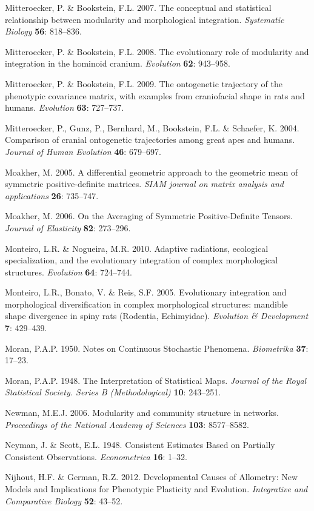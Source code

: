 \documentclass[12pt,twoside]{report}
\begin{document}
Mitteroecker, P. \& Bookstein, F.L. 2007. The conceptual and statistical
relationship between modularity and morphological integration.
\emph{Systematic Biology} \textbf{56}: 818--836.

Mitteroecker, P. \& Bookstein, F.L. 2008. The evolutionary role of
modularity and integration in the hominoid cranium. \emph{Evolution}
\textbf{62}: 943--958.

Mitteroecker, P. \& Bookstein, F.L. 2009. The ontogenetic trajectory of
the phenotypic covariance matrix, with examples from craniofacial shape
in rats and humans. \emph{Evolution} \textbf{63}: 727--737.

Mitteroecker, P., Gunz, P., Bernhard, M., Bookstein, F.L. \& Schaefer,
K. 2004. Comparison of cranial ontogenetic trajectories among great apes
and humans. \emph{Journal of Human Evolution} \textbf{46}: 679--697.

Moakher, M. 2005. A differential geometric approach to the geometric
mean of symmetric positive-definite matrices. \emph{SIAM journal on
matrix analysis and applications} \textbf{26}: 735--747.

Moakher, M. 2006. On the Averaging of Symmetric Positive-Definite
Tensors. \emph{Journal of Elasticity} \textbf{82}: 273--296.

Monteiro, L.R. \& Nogueira, M.R. 2010. Adaptive radiations, ecological
specialization, and the evolutionary integration of complex
morphological structures. \emph{Evolution} \textbf{64}: 724--744.

Monteiro, L.R., Bonato, V. \& Reis, S.F. 2005. Evolutionary integration
and morphological diversification in complex morphological structures:
mandible shape divergence in spiny rats (Rodentia, Echimyidae).
\emph{Evolution \& Development} \textbf{7}: 429--439.

Moran, P.A.P. 1950. Notes on Continuous Stochastic Phenomena.
\emph{Biometrika} \textbf{37}: 17--23.

Moran, P.A.P. 1948. The Interpretation of Statistical Maps.
\emph{Journal of the Royal Statistical Society. Series B
(Methodological)} \textbf{10}: 243--251.

Newman, M.E.J. 2006. Modularity and community structure in networks.
\emph{Proceedings of the National Academy of Sciences} \textbf{103}:
8577--8582.

Neyman, J. \& Scott, E.L. 1948. Consistent Estimates Based on Partially
Consistent Observations. \emph{Econometrica} \textbf{16}: 1--32.

Nijhout, H.F. \& German, R.Z. 2012. Developmental Causes of Allometry:
New Models and Implications for Phenotypic Plasticity and Evolution.
\emph{Integrative and Comparative Biology} \textbf{52}: 43--52.
\end{document}
